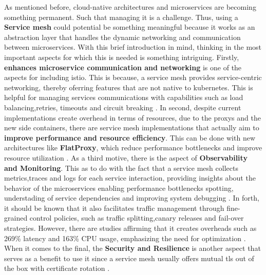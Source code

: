 As mentioned before, cloud-native architectures and microservices are becoming something permanent. Such that managing it is a challenge. Thus, 
using a \textbf{Service mesh} could potential be something meaningful because it works as an abstraction layer that handles the 
dynamic networking and communication between microservices. With this brief introduction in mind, thinking in the most important aspects 
for which this is needed is something intriguing. Firstly, \textbf{enhances microservice communication and networking} is one of the 
aspects for including istio. This is because, a service mesh provides service-centric networking, thereby oferring features that 
are not native to kubernetes. This is helpful for managing services communications with capabilities such as load balancing,retries,
timeouts and circuit breaking \cite{service-mesh-enhance-communications}. In second, despite current implementations create 
overhead in terms of resources, due to the proxys and the new side containers, there are service mesh implementations that actually aim 
to \textbf{improve performance and resource efficiency}. This can be done with new architectures like \textbf{FlatProxy}, which reduce 
performance bottlenecks and improve resource utilization \cite{service-mesh-flat-proxy}. As a third motive, there is the aspect 
of \textbf{Observability and Monitoring}. This as to do with the fact that a service mesh collects metrics,traces and logs for each 
service interaction, providing insights about the behavior of the microservices enabling performance bottlenecks spotting, understading 
of service dependencies and improving system debugging \cite{service-mesh-monitoring}. In forth, it should be known that it also facilitates 
traffic management through fine-grained control policies, such as traffic splitting,canary releases and fail-over strategies. However, 
there are studies affirming that it creates overheads such as 269\% latency and 163\% CPU usage, emphasizing the need for 
optimization \cite{service-mesh-traffic}. When it comes to the final, the \textbf{Security and Resilience} is another aspect that serves 
as a benefit to use it since a service mesh usually offers mutual tls out of the box with certificate rotation \cite{service-mesh-security}. 

